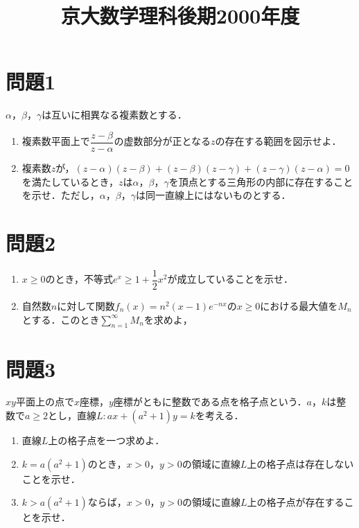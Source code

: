 \documentclass[unicode,12pt, A4j]{ltjsarticle}%
\title{京大数学理科後期2000年度}
\author{}
\date{}
\begin{document}
\maketitle

\section{問題1}
$\alpha$，$\beta$，$\gamma$は互いに相異なる複素数とする．
\begin{enumerate}
 \item 複素数平面上で$\dfrac{z-\beta}{z-\alpha}$の虚数部分が正となる$z$の存在する範囲を図示せよ．
 \item 複素数$z$が，$(z-\alpha)(z-\beta)+(z-\beta)(z-\gamma)+(z-\gamma)(z-\alpha)=0$を満たしているとき，$z$は$\alpha$，$\beta$，$\gamma$を頂点とする三角形の内部に存在することを示せ．ただし，$\alpha$，$\beta$，$\gamma$は同一直線上にはないものとする．
\end{enumerate}


\section{問題2}
\begin{enumerate}
 \item $x\ge 0$のとき，不等式$e^x\ge 1+\dfrac{1}{2}x^2$が成立していることを示せ．
 \item 自然数$n$に対して関数$f_n(x)=n^2(x-1)e^{-nx}$の$x\ge 0$における最大値を$M_n$とする．このとき$\sum_{n=1}^{\infty}M_n$を求めよ，
\end{enumerate}

\section{問題3}
$xy$平面上の点で$x$座標，$y$座標がともに整数である点を格子点という．$a$，$k$は整数で$a\ge 2$とし，直線$L: ax+(a^2+1)y=k$を考える．
\begin{enumerate}
 \item 直線$L$上の格子点を一つ求めよ．
 \item $k=a(a^2+1)$のとき，$x>0$，$y>0$の領域に直線$L$上の格子点は存在しないことを示せ．
 \item $k>a(a^2+1)$ならば，$x>0$，$y>0$の領域に直線$L$上の格子点が存在することを示せ．
\end{enumerate}
\end{document}
